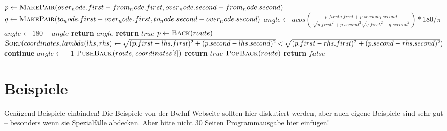 \documentclass[a4paper,10pt,ngerman]{scrartcl}
\begin{document}
    \begin{algorithm}
        \begin{algorithmic}[1]
                \State $p \gets \Call{MakePair}{over_node.first-from_node.first,over_node.second-from_node.second}$
                \State $q \gets \Call{MakePair}{to_node.first-over_node.first,to_node.second-over_node.second}$
                \State $angle \gets acos(\frac{p.firstq.first+p.secondq.second}{\sqrt{p.first^2+p.second^2}\sqrt{q.first^2+q.second^2}})*180/\pi$
                    \State $angle \gets 180-angle$
                \EndIf
                \State \textbf{return} $angle$
            \EndFunction
            \State
                    \State \textbf{return} $true$
                \EndIf
                    \State $p \gets \Call{Back}{route}$
                    \State $\Call{Sort}{coordinates,lambda (lhs,rhs) \gets \sqrt{(p.first-lhs.first)^2+(p.second-lhs.second)^2}<\sqrt{(p.first-rhs.first)^2+(p.second-rhs.second)^2}}$
                \EndIf
                        \State \textbf{continue}
                    \EndIf
                    \State $angle \gets -1$
                    \EndIf
                        \State $\Call{PushBack}{route,coordinates[i]}$
                            \State \textbf{return} $true$
                        \Else
                            \State $\Call{PopBack}{route}$
                        \EndIf
                    \EndIf
                \EndFor
                \State \textbf{return} $false$
            \EndFunction
\end{algorithmic}\label{alg:algorithm}
    \end{algorithm}

    \newpage
    \section{Beispiele}\label{sec:beispiele}
    Genügend Beispiele einbinden!
    Die Beispiele von der BwInf-Webseite sollten hier diskutiert werden,
    aber auch eigene Beispiele sind sehr gut – besonders wenn sie Spezialfälle abdecken.
    Aber bitte nicht 30 Seiten Programmausgabe hier einfügen!
    
\end{document}
